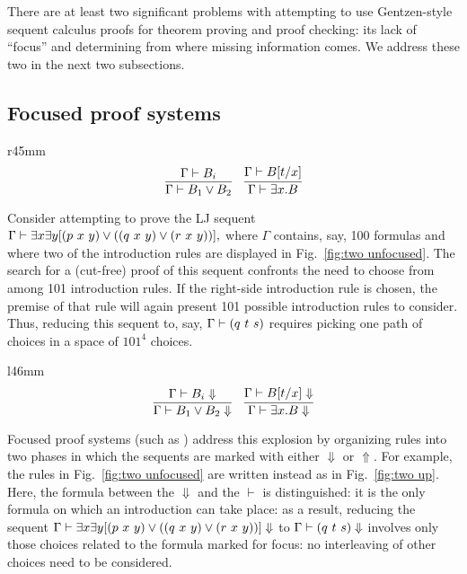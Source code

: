 \documentclass{llncs}
\begin{document}
There are at least two significant problems with attempting to use
Gentzen-style sequent calculus proofs for theorem proving and proof
checking: its lack of ``focus'' and determining from where missing
information comes.  We address these two in the next two subsections.

\subsection{Focused proof systems}

\begin{wrapfigure}{r}{45mm}
\vspace{-.9cm}
\[
\infer{\seq{\Gamma}{B_1\lor B_2}}{\seq{\Gamma}{B_i}} 
\quad
\infer{\seq{\Gamma}{\exists x.B}}{\seq{\Gamma}{B[t/x]}} 
\]
\vspace{-.9cm}
\caption{From the LJ calculus}
\label{fig:two unfocused}
\vspace{-.3cm}
\end{wrapfigure}

Consider attempting to prove the LJ sequent
\(\Gamma\mathrel{\vdash} \exists x\exists y [(p~x~y)\lor ((q~x~y)\lor (r~x~y))],\)
where $\Gamma$
contains, say, 100 formulas and where two of the introduction
rules are displayed in Fig.~\ref{fig:two unfocused}.
%
The search for a (cut-free) proof
of this sequent confronts the need to choose from among 101
introduction rules.  If the right-side introduction
rule is chosen, the premise of that rule will again present
101 possible introduction rules to consider.
%
Thus, reducing this sequent to, say, $\Gamma\mathrel{\vdash} (q~t~s)$ requires
picking one path of choices in a space of $101^4$ choices.

\begin{wrapfigure}{l}{46mm}
\vspace{-.9cm}
\[
\infer{\jRf{\Gamma}{B_1\lor B_2}}{\jRf{\Gamma}{B_i}} 
\quad
\infer{\jRf{\Gamma}{\exists x.B}}{\jRf{\Gamma}{B[t/x]}} 
\]
\vspace{-.8cm}
\caption{Focusing annotations}
\vspace{-.6cm}
\label{fig:two up}
\end{wrapfigure}

Focused proof systems (such as \LJF \cite{liang09tcs}) address this
explosion by organizing rules into two phases in which the sequents
are marked with either $\Downarrow$ or $\Uparrow$.
%
For example, the rules in Fig.~\ref{fig:two unfocused} are written
instead as in Fig.~\ref{fig:two up}.
%
Here, the formula between the $\Downarrow$ and the $\vdash$ is
distinguished: it is the only formula on which an introduction can
take place: as a result, reducing the sequent
\(\Gamma\vdash \exists x\exists y [(p~x~y)\lor ((q~x~y)\lor (r~x~y))]\Downarrow\)
to $\Gamma\vdash (q~t~s)\Downarrow$ involves only those choices related to the
formula marked for focus: no interleaving of other choices need to be
considered.
\end{document}
